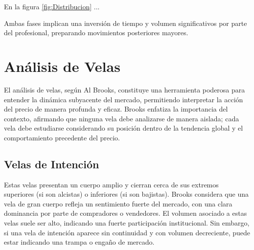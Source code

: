 En la figura \ref{fig:Distribucion} ...

Ambas fases implican una inversi\'on de tiempo y volumen significativos por parte del profesional, preparando movimientos posteriores mayores.




\section{An\'alisis de Velas}

El an\'alisis de velas, seg\'un Al Brooks, constituye una herramienta poderosa para entender la din\'amica subyacente del mercado, permitiendo interpretar la acci\'on del precio de manera profunda y eficaz. Brooks enfatiza la importancia del contexto, afirmando que ninguna vela debe analizarse de manera aislada; cada vela debe estudiarse considerando su posici\'on dentro de la tendencia global y el comportamiento precedente del precio.

\subsection{Velas de Intenci\'on}

Estas velas presentan un cuerpo amplio y cierran cerca de sus extremos superiores (si son alcistas) o inferiores (si son bajistas). Brooks considera que una vela de gran cuerpo refleja un sentimiento fuerte del mercado, con una clara dominancia por parte de compradores o vendedores. El volumen asociado a estas velas suele ser alto, indicando una fuerte participaci\'on institucional. Sin embargo, si una vela de intenci\'on aparece sin continuidad y con volumen decreciente, puede estar indicando una trampa o enga\~no de mercado.

